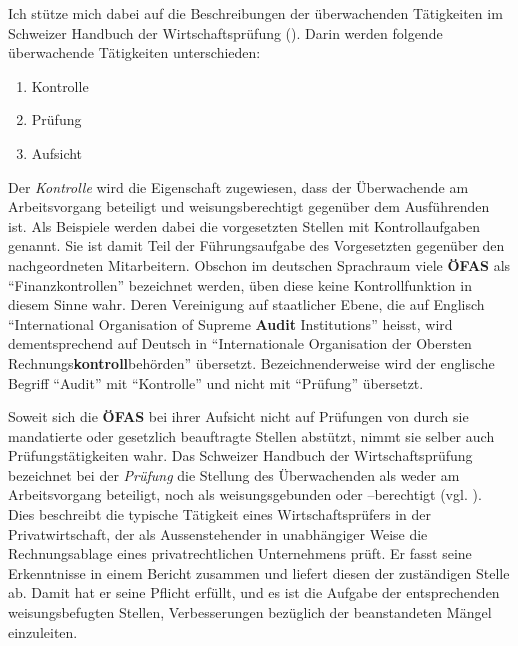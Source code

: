 \documentclass[10pt]{article}
\begin{document}
Ich stütze mich dabei auf die Beschreibungen der überwachenden Tätigkeiten im Schweizer Handbuch der Wirtschaftsprüfung (\cite[S. 4]{WP2}). Darin werden folgende überwachende Tätigkeiten unterschieden:

\begin{enumerate}
    \item Kontrolle

    \item Prüfung

    \item Aufsicht

\end{enumerate}

Der \textit{Kontrolle} wird die Eigenschaft zugewiesen, dass der Überwachende am Arbeitsvorgang beteiligt und weisungsberechtigt gegenüber dem Ausführenden ist. Als Beispiele werden dabei die vorgesetzten Stellen mit Kontrollaufgaben genannt. Sie ist damit Teil der Führungsaufgabe des Vorgesetzten gegenüber den nachgeordneten Mitarbeitern. Obschon im deutschen Sprachraum viele \textbf{ÖFAS} als “{}Finanzkontrollen”{} bezeichnet werden, üben diese keine Kontrollfunktion in diesem Sinne wahr. Deren Vereinigung auf staatlicher Ebene, die auf Englisch “{}International Organisation of Supreme \textbf{Audit} Institutions”{} heisst, wird dementsprechend auf Deutsch in “{}Internationale Organisation der Obersten Rechnungs\textbf{kontroll}behörden”{} übersetzt. Bezeichnenderweise wird der englische Begriff “{}Audit”{} mit “{}Kontrolle”{} und nicht mit “{}Prüfung”{} übersetzt.

Soweit sich die \textbf{ÖFAS} bei ihrer Aufsicht nicht auf Prüfungen von durch sie mandatierte oder gesetzlich beauftragte Stellen abstützt, nimmt sie selber auch Prüfungstätigkeiten wahr. Das Schweizer Handbuch der Wirtschaftsprüfung bezeichnet bei der \textit{Prüfung} die Stellung des Überwachenden als weder am Arbeitsvorgang beteiligt, noch als weisungsgebunden oder --berechtigt (vgl. \cite[S. 4]{WP2}). Dies beschreibt die typische Tätigkeit eines Wirtschaftsprüfers in der Privatwirtschaft, der als Aussenstehender in unabhängiger Weise die Rechnungsablage eines privatrechtlichen Unternehmens prüft. Er fasst seine Erkenntnisse in einem Bericht zusammen und liefert diesen der zuständigen Stelle ab. Damit hat er seine Pflicht erfüllt, und es ist die Aufgabe der entsprechenden weisungsbefugten Stellen, Verbesserungen bezüglich der beanstandeten Mängel einzuleiten.
\end{document}
